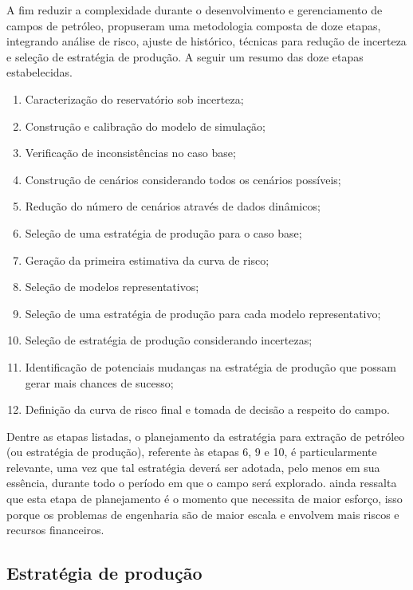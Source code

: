 A fim reduzir a complexidade durante o desenvolvimento e gerenciamento de campos de petróleo,  propuseram uma metodologia composta de doze etapas, integrando análise de risco, ajuste de histórico, técnicas para redução de incerteza e seleção de estratégia de produção. A seguir um resumo das doze etapas estabelecidas.

\begin{enumerate}
\item Caracterização do reservatório sob incerteza;
\item Construção e calibração do modelo de simulação;
\item Verificação de inconsistências no caso base;
\item Construção de cenários considerando todos os cenários possíveis;
\item Redução do número de cenários através de dados dinâmicos;
\item Seleção de uma estratégia de produção para o caso base;
\item Geração da primeira estimativa da curva de risco;
\item Seleção de modelos representativos;
\item Seleção de uma estratégia de produção para cada modelo representativo;
\item Seleção de estratégia de produção considerando incertezas;
\item Identificação de potenciais mudanças na estratégia de produção que possam gerar mais chances de sucesso;
\item Definição da curva de risco final e tomada de decisão a respeito do campo. 

\end{enumerate}

Dentre as etapas listadas, o planejamento da estratégia para extração de petróleo (ou estratégia de produção), referente às etapas 6, 9 e 10, é particularmente relevante, uma vez que tal estratégia deverá ser adotada, pelo menos em sua essência, durante todo o período em que o campo será explorado.  ainda ressalta que esta etapa de planejamento é o momento que necessita de maior esforço, isso porque os problemas de engenharia são de maior escala e envolvem mais riscos e recursos financeiros.

\subsection{Estratégia de produção }

